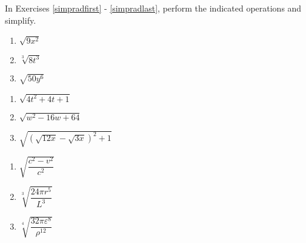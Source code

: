 \documentclass{ximera}
\begin{document}
	\author{Stitz-Zeager}


\label{ExercisesforAppRadEqus}

In Exercises \ref{simpradfirst} - \ref{simpradlast}, perform the indicated operations and simplify.

\begin{multicols}{3}
\begin{enumerate}

\item   $\sqrt{9x^2}$ \label{simpradfirst}

\item   $\sqrt[3]{8t^3}$

\item   $\sqrt{50y^6}$

\setcounter{HW}{\value{enumi}}
\end{enumerate}
\end{multicols}

\begin{multicols}{3}
\begin{enumerate}
\setcounter{enumi}{\value{HW}}

\item  $\sqrt{4t^2 + 4t + 1}$

\item  $\sqrt{w^2 - 16w + 64}$

\item  $\sqrt{(\sqrt{12x} - \sqrt{3x})^2+1}$

\setcounter{HW}{\value{enumi}}
\end{enumerate}
\end{multicols}

\begin{multicols}{3}
\begin{enumerate}
\setcounter{enumi}{\value{HW}}

\item  $\sqrt{\dfrac{c^2 - v^2}{c^2}}$

\item  $\sqrt[3]{\dfrac{24 \pi r^5}{L^3}}$

\item   $\sqrt[4]{\dfrac{32 \pi \varepsilon^8}{\rho^{12}}}$    

\setcounter{HW}{\value{enumi}}
\end{enumerate}
\end{multicols}
\end{document}
